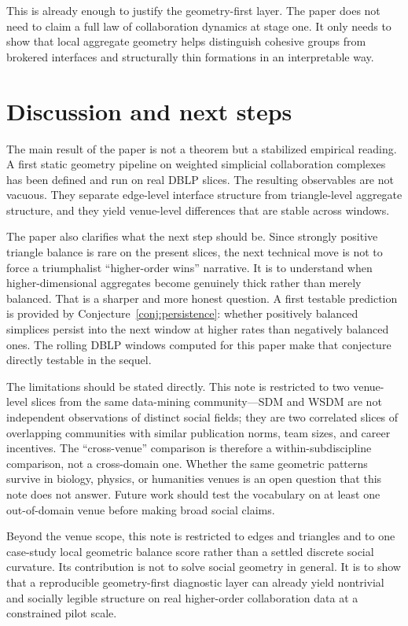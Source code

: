 \documentclass[11pt]{article}
\begin{document}
This is already enough to justify the geometry-first layer. The paper does not need to claim a full law of collaboration dynamics at stage one. It only needs to show that local aggregate geometry helps distinguish cohesive groups from brokered interfaces and structurally thin formations in an interpretable way.

\section{Discussion and next steps}

The main result of the paper is not a theorem but a stabilized empirical reading. A first static geometry pipeline on weighted simplicial collaboration complexes has been defined and run on real DBLP slices. The resulting observables are not vacuous. They separate edge-level interface structure from triangle-level aggregate structure, and they yield venue-level differences that are stable across windows.

The paper also clarifies what the next step should be. Since strongly positive triangle balance is rare on the present slices, the next technical move is not to force a triumphalist ``higher-order wins'' narrative. It is to understand when higher-dimensional aggregates become genuinely thick rather than merely balanced. That is a sharper and more honest question. A first testable prediction is provided by Conjecture~\ref{conj:persistence}: whether positively balanced simplices persist into the next window at higher rates than negatively balanced ones. The rolling DBLP windows computed for this paper make that conjecture directly testable in the sequel.

The limitations should be stated directly. This note is restricted to two venue-level slices from the same data-mining community---SDM and WSDM are not independent observations of distinct social fields; they are two correlated slices of overlapping communities with similar publication norms, team sizes, and career incentives. The ``cross-venue'' comparison is therefore a within-subdiscipline comparison, not a cross-domain one. Whether the same geometric patterns survive in biology, physics, or humanities venues is an open question that this note does not answer. Future work should test the vocabulary on at least one out-of-domain venue before making broad social claims.

Beyond the venue scope, this note is restricted to edges and triangles and to one case-study local geometric balance score rather than a settled discrete social curvature. Its contribution is not to solve social geometry in general. It is to show that a reproducible geometry-first diagnostic layer can already yield nontrivial and socially legible structure on real higher-order collaboration data at a constrained pilot scale.
\end{document}
